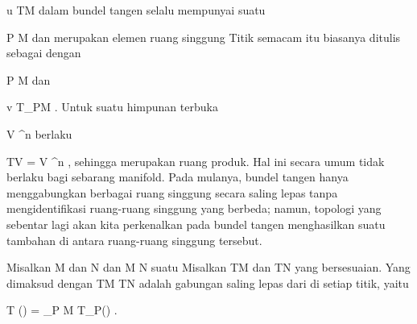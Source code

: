 \mavergleichskette
{\vergleichskette
{ u
}
{ \in }{ TM
}
{  }{
}
{    }{
}
{   }{
}
}
{}{}{}
dalam bundel tangen selalu mempunyai suatu  {}

\mavergleichskette
{\vergleichskette
{ P
}
{ \in }{ M
}
{  }{
}
{    }{
}
{   }{
}
}
{}{}{}
dan merupakan elemen ruang singgung
Titik semacam itu biasanya ditulis sebagai
 dengan

\mavergleichskette
{\vergleichskette
{ P
}
{ \in }{ M
}
{  }{
}
{    }{
}
{   }{
}
}
{}{}{}
dan

\mavergleichskette
{\vergleichskette
{ v
}
{ \in }{ T_PM
}
{  }{
}
{    }{
}
{   }{
}
}
{}{}{.}
Untuk suatu himpunan terbuka

\mavergleichskette
{\vergleichskette
{ V
}
{ \subseteq }{ \R^n
}
{  }{
}
{    }{
}
{   }{
}
}
{}{}{}
berlaku

\mavergleichskette
{\vergleichskette
{ TV
}
{ = }{ V \times \R^n
}
{  }{
}
{    }{
}
{   }{
}
}
{}{}{,}
sehingga merupakan ruang produk. Hal ini secara umum tidak berlaku bagi sebarang manifold. Pada mulanya, bundel tangen hanya menggabungkan berbagai ruang singgung secara saling lepas tanpa mengidentifikasi ruang-ruang singgung yang berbeda; namun, topologi yang sebentar lagi akan kita perkenalkan pada bundel tangen menghasilkan suatu  tambahan di antara ruang-ruang singgung tersebut.

{}
{

Misalkan
\mathkor {} {M} {dan} {N} {}
dan
\maabbdisp {\varphi} { M } { N
} {}
suatu
Misalkan
\mathkor {} {TM} {dan} {TN} {}
yang bersesuaian. Yang dimaksud dengan 
 {TM} {TN
} {}
adalah gabungan saling lepas dari
di setiap titik, yaitu

\mavergleichskettedisp
{\vergleichskette
{ T (\varphi)
}
{ =} { \biguplus_{P \in M} T_P(\varphi)
}
{ } {
}
{ } {
}
{ } {
}
}
{}{}{.}

}

